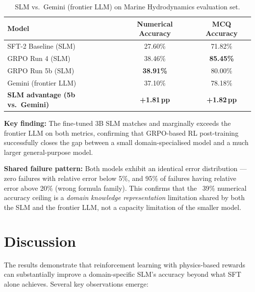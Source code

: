 \documentclass[12pt]{report}
\begin{document}
\begin{table}[H]
\centering
\caption{SLM vs.\ Gemini (frontier LLM) on Marine Hydrodynamics evaluation set.}
\label{tab:llm_comparison}
\begin{tabular}{lcc}
\toprule
\textbf{Model} & \textbf{Numerical Accuracy} & \textbf{MCQ Accuracy} \\
\midrule
SFT-2 Baseline (SLM)      & 27.60\% & 71.82\% \\
GRPO Run 4 (SLM)           & 38.46\% & \textbf{85.45\%} \\
GRPO Run 5b (SLM)          & \textbf{38.91\%} & 80.00\% \\
\midrule
Gemini (frontier LLM)      & 37.10\% & 78.18\% \\
\midrule
\textbf{SLM advantage (5b vs.\ Gemini)} & \textbf{+1.81\,pp} & \textbf{+1.82\,pp} \\
\bottomrule
\end{tabular}
\end{table}

\textbf{Key finding:} The fine-tuned 3B SLM matches and marginally exceeds the frontier LLM on both metrics, confirming that GRPO-based RL post-training successfully closes the gap between a small domain-specialised model and a much larger general-purpose model.

\textbf{Shared failure pattern:} Both models exhibit an identical error distribution --- zero failures with relative error below 5\%, and 95\% of failures having relative error above 20\% (wrong formula family). This confirms that the ~39\% numerical accuracy ceiling is a \textit{domain knowledge representation} limitation shared by both the SLM and the frontier LLM, not a capacity limitation of the smaller model.

\section{Discussion}

The results demonstrate that reinforcement learning with physics-based rewards can substantially improve a domain-specific SLM's accuracy beyond what SFT alone achieves. Several key observations emerge:
\end{document}
